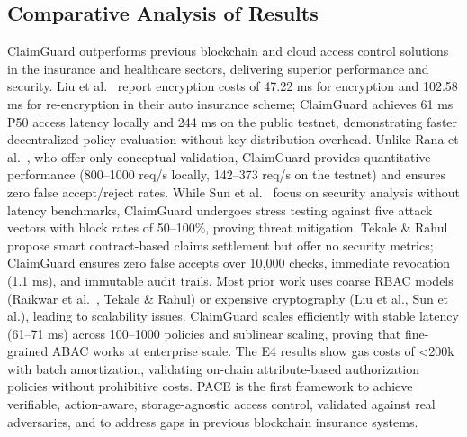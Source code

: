 \documentclass[pdflatex,sn-mathphys-num]{sn-jnl}
\begin{document}
\subsection{Comparative Analysis of Results}
ClaimGuard outperforms previous blockchain and cloud access control solutions in the insurance and healthcare sectors, delivering superior performance and security. Liu et al.~\cite{liu2021auto} report encryption costs of 47.22 ms for encryption and 102.58 ms for re-encryption in their auto insurance scheme; ClaimGuard achieves 61 ms P50 access latency locally and 244 ms on the public testnet, demonstrating faster decentralized policy evaluation without key distribution overhead. Unlike Rana et al.~\cite{rana2022healthcare}, who offer only conceptual validation, ClaimGuard provides quantitative performance (800–1000 req/s locally, 142–373 req/s on the testnet) and ensures zero false accept/reject rates. While Sun et al.~\cite{sun2020emr} focus on security analysis without latency benchmarks, ClaimGuard undergoes stress testing against five attack vectors with block rates of 50–100\%, proving threat mitigation. Tekale \& Rahul~\cite{tekale2023claims} propose smart contract-based claims settlement but offer no security metrics; ClaimGuard ensures zero false accepts over 10,000 checks, immediate revocation (1.1 ms), and immutable audit trails. Most prior work uses coarse RBAC models (Raikwar et al.~\cite{raikwar2018insurance}, Tekale \& Rahul) or expensive cryptography (Liu et al., Sun et al.), leading to scalability issues. ClaimGuard scales efficiently with stable latency (61–71 ms) across 100–1000 policies and sublinear scaling, proving that fine-grained ABAC works at enterprise scale. The E4 results show gas costs of <200k with batch amortization, validating on-chain attribute-based authorization policies without prohibitive costs. PACE is the first framework to achieve verifiable, action-aware, storage-agnostic access control, validated against real adversaries, and to address gaps in previous blockchain insurance systems.
\end{document}
